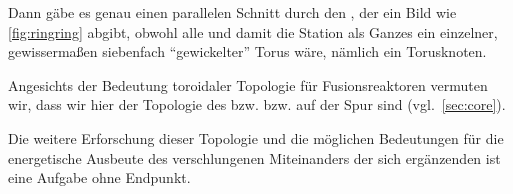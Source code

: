 Dann gäbe es genau einen parallelen Schnitt durch den , der ein Bild wie \cref{fig:ringring} abgibt, obwohl alle  und damit die Station als Ganzes ein einzelner, gewissermaßen siebenfach "`gewickelter"' Torus wäre, nämlich ein Torusknoten.

Angesichts der Bedeutung toroidaler Topologie für Fusionsreaktoren vermuten wir, dass wir hier der Topologie des  bzw.  bzw.   auf der Spur sind (vgl.~\cref{sec:core}). 

Die weitere Erforschung dieser Topologie und die möglichen Bedeutungen für die energetische Ausbeute des verschlungenen Miteinanders der sich ergänzenden  ist eine Aufgabe ohne Endpunkt.



    
